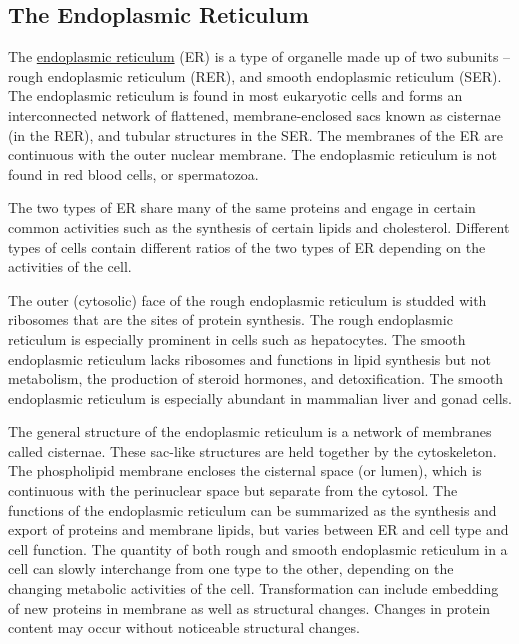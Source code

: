 \hypertarget{the-endoplasmic-reticulum}{%
\subsection{The Endoplasmic Reticulum}\label{the-endoplasmic-reticulum}}

The \href{https://en.wikipedia.org/wiki/Endoplasmic_reticulum}{endoplasmic reticulum} (ER) is a type of organelle made up of two subunits -- rough endoplasmic reticulum (RER), and smooth endoplasmic reticulum (SER). The endoplasmic reticulum is found in most eukaryotic cells and forms an interconnected network of flattened, membrane-enclosed sacs known as cisternae (in the RER), and tubular structures in the SER. The membranes of the ER are continuous with the outer nuclear membrane. The endoplasmic reticulum is not found in red blood cells, or spermatozoa.

The two types of ER share many of the same proteins and engage in certain common activities such as the synthesis of certain lipids and cholesterol. Different types of cells contain different ratios of the two types of ER depending on the activities of the cell.

The outer (cytosolic) face of the rough endoplasmic reticulum is studded with ribosomes that are the sites of protein synthesis. The rough endoplasmic reticulum is especially prominent in cells such as hepatocytes. The smooth endoplasmic reticulum lacks ribosomes and functions in lipid synthesis but not metabolism, the production of steroid hormones, and detoxification. The smooth endoplasmic reticulum is especially abundant in mammalian liver and gonad cells.

The general structure of the endoplasmic reticulum is a network of membranes called cisternae. These sac-like structures are held together by the cytoskeleton. The phospholipid membrane encloses the cisternal space (or lumen), which is continuous with the perinuclear space but separate from the cytosol. The functions of the endoplasmic reticulum can be summarized as the synthesis and export of proteins and membrane lipids, but varies between ER and cell type and cell function. The quantity of both rough and smooth endoplasmic reticulum in a cell can slowly interchange from one type to the other, depending on the changing metabolic activities of the cell. Transformation can include embedding of new proteins in membrane as well as structural changes. Changes in protein content may occur without noticeable structural changes.

